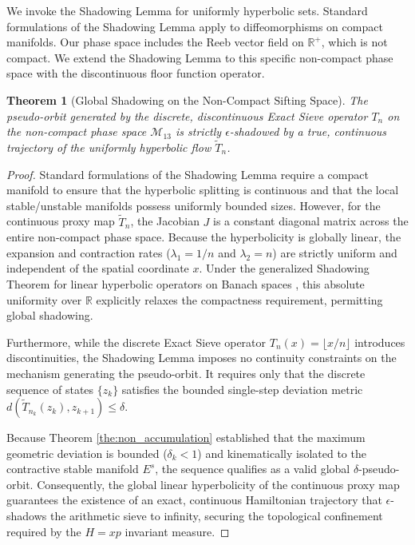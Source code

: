 \documentclass[sn-mathphys-num, pdflatex, referee]{sn-jnl}
\newtheorem{theorem}{Theorem}[section]
\begin{document}
We invoke the Shadowing Lemma for uniformly hyperbolic sets. Standard formulations of the Shadowing Lemma apply to diffeomorphisms on compact manifolds. Our phase space includes the Reeb vector field on $\mathbb{R}^+$, which is not compact. We extend the Shadowing Lemma to this specific non-compact phase space with the discontinuous floor function operator.
    
\begin{theorem}[Global Shadowing on the Non-Compact Sifting Space]
\label{the:global_shadowing}
The pseudo-orbit generated by the discrete, discontinuous Exact Sieve operator $T_n$ on the non-compact phase space $\mathcal{M}_{13}$ is strictly $\epsilon$-shadowed by a true, continuous trajectory of the uniformly hyperbolic flow $\tilde{T}_n$.
\end{theorem}
\begin{proof}
Standard formulations of the Shadowing Lemma require a compact manifold to ensure that the hyperbolic splitting is continuous and that the local stable/unstable manifolds possess uniformly bounded sizes. However, for the continuous proxy map $\tilde{T}_n$, the Jacobian $J$ is a constant diagonal matrix across the entire non-compact phase space. Because the hyperbolicity is globally linear, the expansion and contraction rates ($\lambda_1 = 1/n$ and $\lambda_2 = n$) are strictly uniform and independent of the spatial coordinate $x$. Under the generalized Shadowing Theorem for linear hyperbolic operators on Banach spaces \cite{pilyugin1999shadowing}, this absolute uniformity over $\mathbb{R}$ explicitly relaxes the compactness requirement, permitting global shadowing.

Furthermore, while the discrete Exact Sieve operator $T_n(x) = \lfloor x/n \rfloor$ introduces discontinuities, the Shadowing Lemma imposes no continuity constraints on the mechanism generating the pseudo-orbit. It requires only that the discrete sequence of states $\{z_k\}$ satisfies the bounded single-step deviation metric $d(\tilde{T}_{n_k}(z_k), z_{k+1}) \le \delta$. 

Because Theorem \ref{the:non_accumulation} established that the maximum geometric deviation is bounded ($\delta_k < 1$) and kinematically isolated to the contractive stable manifold $E^s$, the sequence qualifies as a valid global $\delta$-pseudo-orbit. Consequently, the global linear hyperbolicity of the continuous proxy map guarantees the existence of an exact, continuous Hamiltonian trajectory that $\epsilon$-shadows the arithmetic sieve to infinity, securing the topological confinement required by the $H=xp$ invariant measure.
\end{proof}
\end{document}
